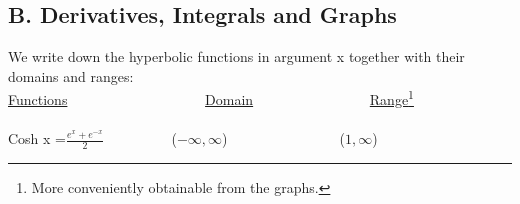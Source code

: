 \documentclass{article}
\begin{document}
\large
\subsection*{B.  Derivatives, Integrals and Graphs}
\small
We write down the hyperbolic functions in argument x together with their domains and ranges:
\\ \underline{Functions} \ \ \ \ \ \ \ \ \ \ \ \ \ \ \ \ \ \ \ \underline{Domain} \ \ \ \ \ \ \ \ \ \ \ \ \ \ \ \ \underline{Range}\footnote{More conveniently obtainable from the graphs.}
\\
\\Cosh x =$\frac{e^x + e^{-x}}{2}$ \ \ \ \ \ \ \ \ \ ($-\infty , \infty$)\ \ \ \ \ \ \ \ \ \ \ \ \ \ \ \ ($1, \infty $)
\end{document}
